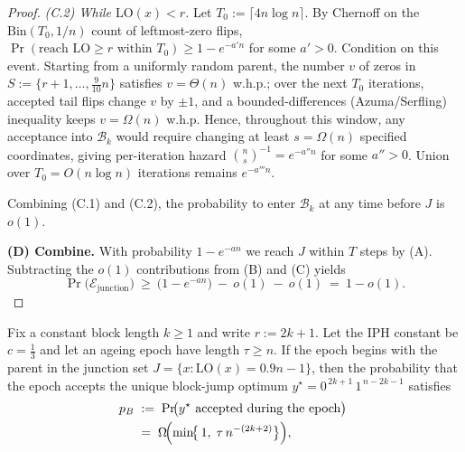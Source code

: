 \documentclass[lettersize,journal]{IEEEtran}
\begin{document}
\begin{proof}
	\emph{(C.2) While $\mathrm{LO}(x)< r$.}
	Let $T_0:=\lceil 4 n\log n\rceil$.  By Chernoff on the $\mathrm{Bin}(T_0,1/n)$ count of leftmost-zero
	flips, $\Pr(\text{reach }\mathrm{LO}\ge r\text{ within }T_0)\ge 1-e^{-a' n}$ for some $a'>0$.
	Condition on this event. Starting from a uniformly random parent, the number $v$ of zeros in
	$S:=\{r{+}1,\dots,\tfrac{9}{10}n\}$ satisfies $v=\Theta(n)$ w.h.p.; over the next $T_0$ iterations,
	accepted tail flips change $v$ by $\pm1$, and a bounded-differences (Azuma/Serfling) inequality keeps
	$v=\Omega(n)$ w.h.p.  Hence, throughout this window, any acceptance into $\mathcal{B}_k$ would require
	changing at least $s=\Omega(n)$ specified coordinates, giving per-iteration hazard
	$\binom{n}{s}^{-1}=e^{-a'' n}$ for some $a''>0$.  Union over $T_0=O(n\log n)$ iterations remains
	$e^{-a''' n}$.
	
	Combining (C.1) and (C.2), the probability to enter $\mathcal{B}_k$ at any time before $J$ is $o(1)$.
	
	\medskip\noindent
	\textbf{(D) Combine.}
	With probability $1-e^{-a n}$ we reach $J$ within $T$ steps by (A).  Subtracting the $o(1)$
	contributions from (B) and (C) yields
	\[
	\Pr\bigl(\mathcal{E}_{\mathrm{junction}}\bigr)
	\ \ge\
	\bigl(1-e^{-a n}\bigr)\ -\ o(1)\ -\ o(1)
	\ =\
	1-o(1).
	\]
\end{proof}



\begin{lemma}
	\label{lem:BJO-epoch}
	Fix a constant block length \(k\ge 1\) and write \(r:=2k+1\).
	Let the IPH constant be \(c=\tfrac13\) and let an ageing epoch have length
	\(\tau\ge n\).  
	If the epoch begins with the parent in the junction set
	\(J=\bigl\{x:\mathrm{LO}(x)=0.9n-1\bigr\}\),
	then the probability that the epoch accepts the unique block-jump optimum $y^{\star}=0^{\,2k+1}\,1^{\,n-2k-1}$ satisfies
	\begin{align*}
			p_B
		\;&:=\;
		\Pr\!\bigl(\text{$y^{\star}$ accepted during the epoch}\bigr)
		\;\\&=\;
		\Omega\!\Bigl(\min\!\bigl\{\,1,\;
		\tau\,n^{-(2k+2)}\bigr\}\Bigr),
	\end{align*}
\end{lemma}
\end{document}
